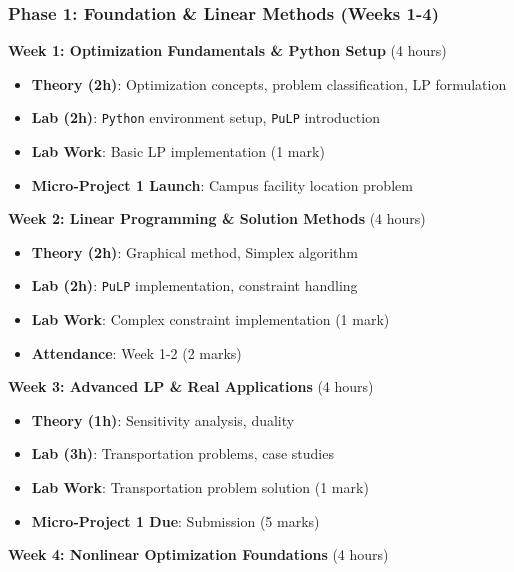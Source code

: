 \documentclass[
  letterpaper,
  DIV=11,
  numbers=noendperiod]{scrreprt}
\providecommand{\tightlist}{%
  \setlength{\itemsep}{0pt}\setlength{\parskip}{0pt}}
\begin{document}
\subsubsection*{Phase 1: Foundation \& Linear Methods (Weeks
1-4)}\label{phase-1-foundation-linear-methods-weeks-1-4}

\textbf{Week 1: Optimization Fundamentals \& Python Setup} (4 hours)

\begin{itemize}
\tightlist
\item
  \textbf{Theory (2h)}: Optimization concepts, problem classification,
  LP formulation
\item
  \textbf{Lab (2h)}: \texttt{Python} environment setup, \texttt{PuLP}
  introduction
\item
  \textbf{Lab Work}: Basic LP implementation (1 mark)
\item
  \textbf{Micro-Project 1 Launch}: Campus facility location problem
\end{itemize}

\textbf{Week 2: Linear Programming \& Solution Methods} (4 hours)

\begin{itemize}
\tightlist
\item
  \textbf{Theory (2h)}: Graphical method, Simplex algorithm
\item
  \textbf{Lab (2h)}: \texttt{PuLP} implementation, constraint handling
\item
  \textbf{Lab Work}: Complex constraint implementation (1 mark)
\item
  \textbf{Attendance}: Week 1-2 (2 marks)
\end{itemize}

\textbf{Week 3: Advanced LP \& Real Applications} (4 hours)

\begin{itemize}
\tightlist
\item
  \textbf{Theory (1h)}: Sensitivity analysis, duality
\item
  \textbf{Lab (3h)}: Transportation problems, case studies
\item
  \textbf{Lab Work}: Transportation problem solution (1 mark)
\item
  \textbf{Micro-Project 1 Due}: Submission (5 marks)
\end{itemize}

\textbf{Week 4: Nonlinear Optimization Foundations} (4 hours)
\end{document}
